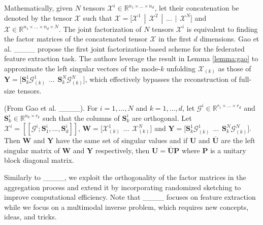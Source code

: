 Mathematically, given $N$ tensors $\boldsymbol{\mathcal{X}}^i \in \mathbb{R}^{n_1\times...\times n_d}$, let their concatenation be denoted by the tensor $\boldsymbol{\mathcal{X}}$ such that $\boldsymbol{\mathcal{X}} = \big[\boldsymbol{\mathcal{X}}^1\hspace{5pt}|\hspace{5pt} \boldsymbol{\mathcal{X}}^2 \hspace{5pt}|\hspace{5pt} ... \hspace{5pt}|\hspace{5pt} \boldsymbol{\mathcal{X}}^N\big]$ and $\boldsymbol{\mathcal{X}} \in \mathbb{R}^{n_1 \times ... \times n_d \times N}$. The joint factorization of $N$ tensors $\boldsymbol{\mathcal{X}}^i$ is equivalent to finding the factor matrices of the concatenated tensor $\boldsymbol{\mathcal{X}}$ in the first $d$ dimensions. Gao et al. ____ propose the first joint factorization-based scheme for the federated feature extraction task. The authors leverage the result in Lemma \ref{lemma:gao} to approximate the left singular vectors of the mode-$k$ unfolding $\boldsymbol{\mathcal{X}}_{(k)}$ as those of $\mathbf{Y} = \big[\mathbf{S}_k^1\boldsymbol{\mathcal{G}}^1_{(k)} \hspace{5pt} ... \hspace{5pt} \mathbf{S}_k^N\boldsymbol{\mathcal{G}}^N_{(k)}\big]$, which effectively bypasses the reconstruction of full-size tensors. 
\begin{lemma}\label{lemma:gao}
(From Gao et al. ____). For $i=1,...,N$ and $k=1,...,d$, let $\boldsymbol{\mathcal{G}}^i \in \mathbb{R}^{r_1\times...\times r_d}$ and $\mathbf{S}^i_k \in \mathbb{R}^{n_k\times r_k}$ such that the columns of $\mathbf{S}^i_k$ are orthogonal. Let $\boldsymbol{\mathcal{X}}^i = [\![\boldsymbol{\mathcal{G}}^i; \mathbf{S}_1^i, ..., \mathbf{S}_d^i]\!]$, $\mathbf{W} = \big[\boldsymbol{\mathcal{X}}^1_{(k)} \hspace{5pt} ... \hspace{5pt} \boldsymbol{\mathcal{X}}^N_{(k)} \big]$ and $\mathbf{Y} = \big[\mathbf{S}_k^1\boldsymbol{\mathcal{G}}^1_{(k)} \hspace{5pt} ... \hspace{5pt} \mathbf{S}_k^N\boldsymbol{\mathcal{G}}^N_{(k)}\big]$. Then $\mathbf{W}$ and $\mathbf{Y}$ have the same set of singular values and if $\mathbf{U}$ and $\mathbf{\bar{U}}$ are the left singular matrix of $\mathbf{W}$ and $\mathbf{Y}$ respectively, then $\mathbf{U} = \bar{\mathbf{U}}\mathbf{P}$ where $\mathbf{P}$ is a unitary block diagonal matrix. 
\end{lemma}
Similarly to ____, we exploit the orthogonality of the factor matrices in the aggregation process and extend it by incorporating randomized sketching to improve computational efficiency. Note that ____ focuses on feature extraction while we focus on a multimodal inverse problem, which requires new concepts, ideas, and tricks.


